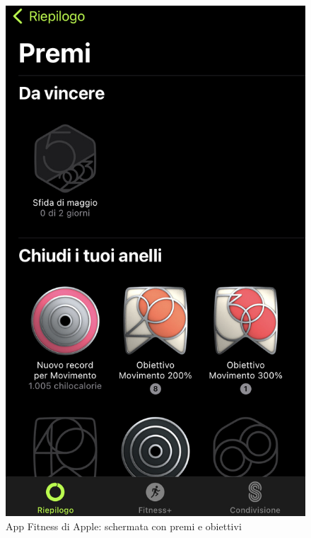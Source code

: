 \begin{figure}
    \begin{minipage}[h]{0.4\textwidth}
        \centering
        \includegraphics[width=1\textwidth]{img/apple-fitness-badge.jpeg}
        \caption{App Fitness di Apple: schermata con premi e obiettivi}
        \label{fig:appleFitnessBadges}
    \end{minipage}
    \hfill
    \vspace{0.2 cm}
    \begin{minipage}[h]{0.4\linewidth}
        \centering

\end{minipage}
\end{figure}
